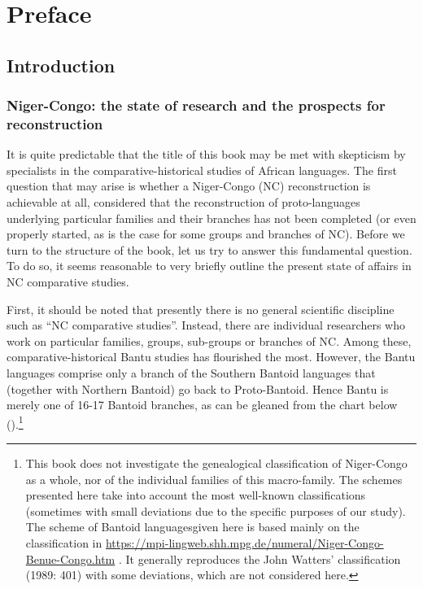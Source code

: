 \chapter{Preface}
\section{Introduction}
\subsection{Niger-Congo: the state of research and the prospects for reconstruction} 

It is quite predictable that the title of this book may be met with skepticism by specialists in the comparative-historical studies of African languages. The first question that may arise is whether a Niger-Congo (NC) reconstruction is achievable at all, considered that the reconstruction of proto-languages underlying particular families and their branches has not been completed (or even properly started, as is the case for some groups and branches of NC). Before we turn to the structure of the book, let us try to answer this fundamental question. To do so, it seems reasonable to very briefly outline the present state of affairs in NC comparative studies. 

First, it should be noted that presently there is no general scientific discipline such as “NC comparative studies”. Instead, there are individual researchers who work on particular families, groups, sub-groups or branches of NC. Among these, comparative-historical Bantu studies has flourished the most. However, the Bantu languages comprise only a branch of the Southern Bantoid languages that (together with Northern Bantoid) go back to Proto-Bantoid. Hence Bantu is merely one of 16-17 Bantoid branches, as can be gleaned from the chart below ().\footnote{This book does not investigate the genealogical classification of Niger-Congo as a whole, nor of the individual families of this macro-family. The schemes presented here take into account the most well-known classifications (sometimes with small deviations due to the specific purposes of our study). The scheme of Bantoid languages ​​given here is based mainly on the classification in \url{https://mpi-lingweb.shh.mpg.de/numeral/Niger-Congo-Benue-Congo.htm} . It generally reproduces the John Watters' classification (1989: 401) with some deviations, which are not considered here.}

